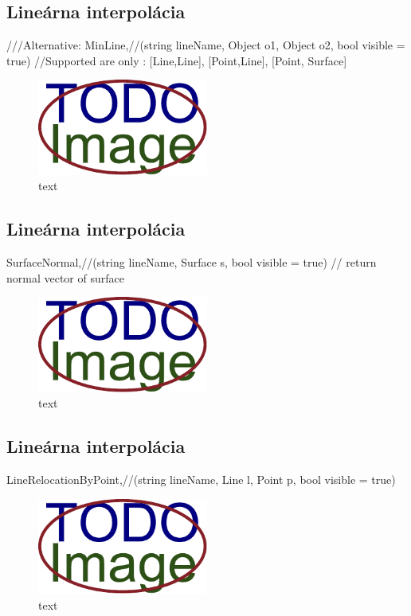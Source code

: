 \subsection{Lineárna interpolácia}
		///Alternative:
		MinLine,//(string lineName, Object o1, Object o2, bool visible = true) //Supported are only : [Line,Line], [Point,Line], [Point, Surface]


\begin{figure}[H]
	\centering
	\includegraphics[width=0.5\textwidth]{obrazky-figures/placeholder.pdf}
	\caption{text}
	\label{fig:1}
\end{figure}



\subsection{Lineárna interpolácia}
		SurfaceNormal,//(string lineName, Surface s, bool visible = true) // return normal vector of surface


\begin{figure}[H]
	\centering
	\includegraphics[width=0.5\textwidth]{obrazky-figures/placeholder.pdf}
	\caption{text}
	\label{fig:1}
\end{figure}



\subsection{Lineárna interpolácia}
		LineRelocationByPoint,//(string lineName, Line l, Point p, bool visible = true)


\begin{figure}[H]
	\centering
	\includegraphics[width=0.5\textwidth]{obrazky-figures/placeholder.pdf}
	\caption{text}
	\label{fig:1}
\end{figure}

